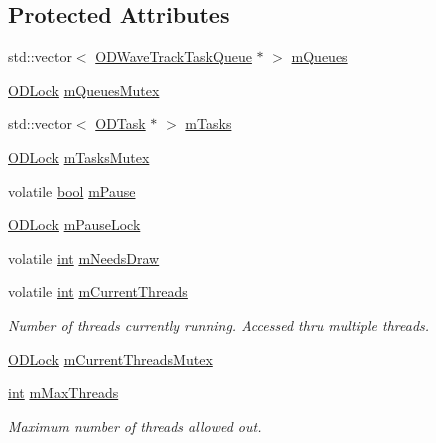 \subsection*{Protected Attributes}
\begin{DoxyCompactItemize}
\item 
std\+::vector$<$ \hyperlink{class_o_d_wave_track_task_queue}{O\+D\+Wave\+Track\+Task\+Queue} $\ast$ $>$ \hyperlink{class_o_d_manager_ad6b9a0871a6624fa11b9deee2f23dd98}{m\+Queues}
\item 
\hyperlink{class_o_d_lock}{O\+D\+Lock} \hyperlink{class_o_d_manager_a8bac5038bf5f5180de202e37e94258f4}{m\+Queues\+Mutex}
\item 
std\+::vector$<$ \hyperlink{class_o_d_task}{O\+D\+Task} $\ast$ $>$ \hyperlink{class_o_d_manager_ae8285de40c66dd8dd1ef3d9f9f2f69ae}{m\+Tasks}
\item 
\hyperlink{class_o_d_lock}{O\+D\+Lock} \hyperlink{class_o_d_manager_a9d307a10f6c2f48655c84ecc21b94ac2}{m\+Tasks\+Mutex}
\item 
volatile \hyperlink{mac_2config_2i386_2lib-src_2libsoxr_2soxr-config_8h_abb452686968e48b67397da5f97445f5b}{bool} \hyperlink{class_o_d_manager_aebe05c8e1092dcca2db0a69236316dcd}{m\+Pause}
\item 
\hyperlink{class_o_d_lock}{O\+D\+Lock} \hyperlink{class_o_d_manager_a59f76b74b2ee0e6ffb44e954fef857e8}{m\+Pause\+Lock}
\item 
volatile \hyperlink{xmltok_8h_a5a0d4a5641ce434f1d23533f2b2e6653}{int} \hyperlink{class_o_d_manager_ac03e55bb072bc1e81e73a7d86523b6f4}{m\+Needs\+Draw}
\item 
volatile \hyperlink{xmltok_8h_a5a0d4a5641ce434f1d23533f2b2e6653}{int} \hyperlink{class_o_d_manager_a06856d83f378f240132c1520405f5040}{m\+Current\+Threads}
\begin{DoxyCompactList}\small\item\em Number of threads currently running. Accessed thru multiple threads. \end{DoxyCompactList}\item 
\hyperlink{class_o_d_lock}{O\+D\+Lock} \hyperlink{class_o_d_manager_abed3761c5ea4877de3d9ec263b3da865}{m\+Current\+Threads\+Mutex}
\item 
\hyperlink{xmltok_8h_a5a0d4a5641ce434f1d23533f2b2e6653}{int} \hyperlink{class_o_d_manager_ac85438f32145747ba36ebf7087860a35}{m\+Max\+Threads}
\begin{DoxyCompactList}\small\item\em Maximum number of threads allowed out. \end{DoxyCompactList}\item 

\end{DoxyCompactItemize}

